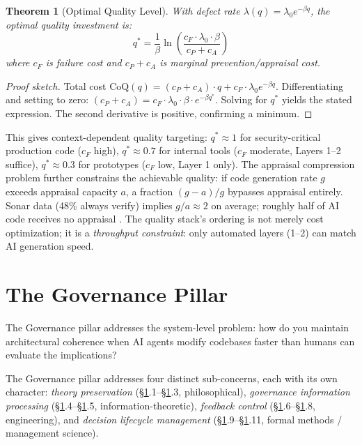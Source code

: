 \documentclass[11pt, a4paper]{googledeepmind}
\newtheorem{theorem}{Theorem}[section]
\begin{document}
\begin{theorem}[Optimal Quality Level]
\label{thm:optquality}
With defect rate $\lambda(q) = \lambda_0 e^{-\beta q}$, the optimal quality investment is:
\begin{equation}
q^* = \frac{1}{\beta} \ln\!\left(\frac{c_F \cdot \lambda_0 \cdot \beta}{c_P + c_A}\right)
\end{equation}
where $c_F$ is failure cost and $c_P + c_A$ is marginal prevention/appraisal cost.
\end{theorem}

\begin{proof}[Proof sketch]
Total cost $\text{CoQ}(q) = (c_P + c_A) \cdot q + c_F \cdot \lambda_0 e^{-\beta q}$. Differentiating and setting to zero: $(c_P + c_A) = c_F \cdot \lambda_0 \cdot \beta \cdot e^{-\beta q^*}$. Solving for $q^*$ yields the stated expression. The second derivative is positive, confirming a minimum.
\end{proof}

This gives context-dependent quality targeting: $q^* \approx 1$ for security-critical production code ($c_F$ high), $q^* \approx 0.7$ for internal tools ($c_F$ moderate, Layers 1--2 suffice), $q^* \approx 0.3$ for prototypes ($c_F$ low, Layer 1 only). The appraisal compression problem further constrains the achievable quality: if code generation rate $g$ exceeds appraisal capacity $a$, a fraction $(g-a)/g$ bypasses appraisal entirely. Sonar data (48\% always verify) implies $g/a \approx 2$ on average; roughly half of AI code receives no appraisal \citep{sonar2026}. The quality stack's ordering is not merely cost optimization; it is a \emph{throughput constraint}: only automated layers (1--2) can match AI generation speed.


\section{The Governance Pillar}
\label{sec:governance}

The Governance pillar addresses the system-level problem: how do you maintain architectural coherence when AI agents modify codebases faster than humans can evaluate the implications?

\noindent The Governance pillar addresses four distinct sub-concerns, each with its own character: \emph{theory preservation} (\S\ref{sec:governance}.1--\S\ref{sec:governance}.3, philosophical), \emph{governance information processing} (\S\ref{sec:governance}.4--\S\ref{sec:governance}.5, information-theoretic), \emph{feedback control} (\S\ref{sec:governance}.6--\S\ref{sec:governance}.8, engineering), and \emph{decision lifecycle management} (\S\ref{sec:governance}.9--\S\ref{sec:governance}.11, formal methods / management science).
\end{document}
